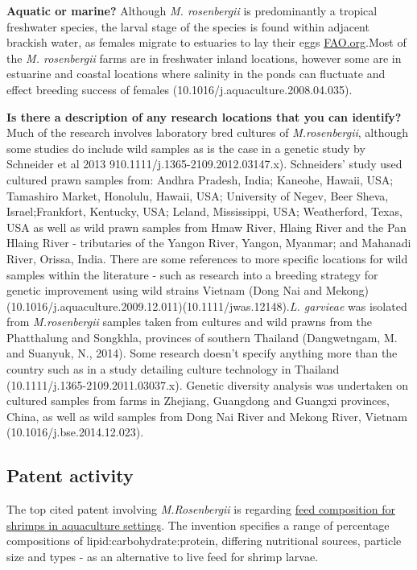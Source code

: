 \documentclass[]{book}
\theoremstyle{definition}
\theoremstyle{definition}
\theoremstyle{definition}
\theoremstyle{remark}
\begin{document}
\textbf{Aquatic or marine?} Although \emph{M. rosenbergii} is
predominantly a tropical freshwater species, the larval stage of the
species is found within adjacent brackish water, as females migrate to
estuaries to lay their eggs
\href{http://www.fao.org/fishery/culturedspecies/Macrobrachium_rosenbergii/en}{FAO.org}.Most
of the \emph{M. rosenbergii} farms are in freshwater inland locations,
however some are in estuarine and coastal locations where salinity in
the ponds can fluctuate and effect breeding success of females
(10.1016/j.aquaculture.2008.04.035).

\textbf{Is there a description of any research locations that you can
identify?}\\
Much of the research involves laboratory bred cultures of
\emph{M.rosenbergii}, although some studies do include wild samples as
is the case in a genetic study by Schneider et al 2013
910.1111/j.1365-2109.2012.03147.x). Schneiders' study used cultured
prawn samples from: Andhra Pradesh, India; Kaneohe, Hawaii, USA;
Tamashiro Market, Honolulu, Hawaii, USA; University of Negev, Beer
Sheva, Israel;Frankfort, Kentucky, USA; Leland, Mississippi, USA;
Weatherford, Texas, USA as well as wild prawn samples from Hmaw River,
Hlaing River and the Pan Hlaing River - tributaries of the Yangon River,
Yangon, Myanmar; and Mahanadi River, Orissa, India. There are some
references to more specific locations for wild samples within the
literature - such as research into a breeding strategy for genetic
improvement using wild strains Vietnam (Dong Nai and Mekong)
(10.1016/j.aquaculture.2009.12.011)(10.1111/jwas.12148).\emph{L.
garvieae} was isolated from \emph{M.rosenbergii} samples taken from
cultures and wild prawns from the Phatthalung and Songkhla, provinces of
southern Thailand (Dangwetngam, M. and Suanyuk, N., 2014). Some research
doesn't specify anything more than the country such as in a study
detailing culture technology in Thailand
(10.1111/j.1365-2109.2011.03037.x). Genetic diversity analysis was
undertaken on cultured samples from farms in Zhejiang, Guangdong and
Guangxi provinces, China, as well as wild samples from Dong Nai River
and Mekong River, Vietnam (10.1016/j.bse.2014.12.023).

\hypertarget{patent-activity-3}{%
\subsection{Patent activity}\label{patent-activity-3}}

The top cited patent involving \emph{M.Rosenbergii} is regarding
\href{https://www.lens.org/lens/patent/WO_2008_084074_A2}{feed
composition for shrimps in aquaculture settings}. The invention
specifies a range of percentage compositions of
lipid:carbohydrate:protein, differing nutritional sources, particle size
and types - as an alternative to live feed for shrimp larvae.
\end{document}
